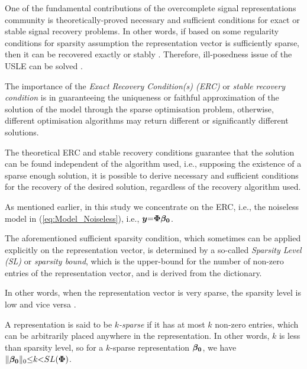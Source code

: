 One of the fundamental contributions of the overcomplete signal representations community is theoretically-proved necessary and sufficient conditions for exact or stable signal recovery problems.
In other words, if based on some regularity conditions for sparsity assumption the representation vector is sufficiently sparse, then it can be recovered exactly or stably \cite{Vaiter2015}. 
Therefore, ill-posedness issue of the USLE can be solved \cite{Donoho2006a}.

The importance of the \emph{Exact Recovery Condition(s) (ERC)} or \emph{stable recovery condition} is in guaranteeing the uniqueness or faithful approximation of the solution of the model through the sparse optimisation problem, otherwise, different optimisation algorithms may return different or significantly different solutions. 

The theoretical ERC and stable recovery conditions guarantee that the solution can be found independent of the algorithm used, i.e., supposing the existence of a sparse enough solution, it is possible to derive necessary and sufficient conditions for the recovery of the desired solution, regardless of the recovery algorithm used.

As mentioned earlier, in this study we concentrate on the ERC, i.e., the noiseless model in (\ref{eq:Model_Noiseless}), i.e., $\boldsymbol{y} {=} \boldsymbol{\Phi} \boldsymbol{\beta_0}$.

The aforementioned sufficient sparsity condition, which sometimes can be applied explicitly on the representation vector, is determined by a so-called \emph{Sparsity Level (SL)} or \emph{sparsity bound}, which is the upper-bound for the number of non-zero entries of the representation vector, and is derived from the dictionary. 

In other words, when the representation vector is very sparse, the sparsity level is low and vice versa \cite{Donoho2001,Cand`es2005b,Chartrand2007,Cai2010}.

A representation is said to be \emph{$k$-sparse} if it has at most $k$ non-zero entries, which can be arbitrarily placed anywhere in the representation.
In other words, $k$ is less than sparsity level, so for a $k$-sparse representation $\boldsymbol{\beta_0}$, we have $\Vert \boldsymbol{\beta_0} \Vert_0 {\leq} k {<} SL(\boldsymbol{\Phi})$.

